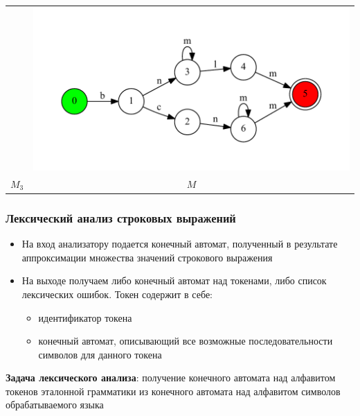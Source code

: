 \documentclass{beamer}
\begin{document}
\begin{frame}[fragile]
\begin{tabular}{c c}
\begin{minipage}{.25\textwidth}
     \end{minipage} 
     &
     \begin{minipage}{.65\textwidth} 
     \includegraphics[width=\linewidth]{replace_example}
     \end{minipage} \\     
     $M_3$ & $M$ \\
\end{tabular}
\end{frame}


\begin{frame}
\transwipe[direction=90]
\frametitle{Лексический анализ строковых выражений}
\begin{itemize}
\item На вход анализатору подается конечный автомат, полученный в результате аппроксимации множества значений строкового выражения
\item На выходе получаем либо конечный автомат над токенами, либо список лексических ошибок. Токен содержит в себе:
    \begin{itemize}
    \item идентификатор токена
    \item конечный автомат, описывающий все возможные последовательности символов для данного токена
    \end{itemize}
\end{itemize}

\begin{block}{}
\textbf{Задача лексического анализа}: получение конечного автомата над алфавитом токенов эталонной грамматики из конечного автомата над алфавитом символов обрабатываемого языка
\end{block}

\end{frame}
\end{document}
